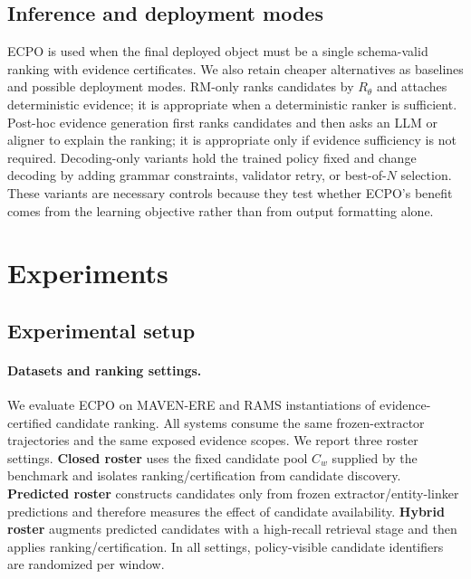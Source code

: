 \documentclass{article}
\begin{document}
\subsection{Inference and deployment modes}
ECPO is used when the final deployed object must be a single schema-valid ranking with evidence certificates. We also retain cheaper alternatives as baselines and possible deployment modes. RM-only ranks candidates by $R_\theta$ and attaches deterministic evidence; it is appropriate when a deterministic ranker is sufficient. Post-hoc evidence generation first ranks candidates and then asks an LLM or aligner to explain the ranking; it is appropriate only if evidence sufficiency is not required. Decoding-only variants hold the trained policy fixed and change decoding by adding grammar constraints, validator retry, or best-of-$N$ selection. These variants are necessary controls because they test whether ECPO's benefit comes from the learning objective rather than from output formatting alone.

\section{Experiments}
\label{sec:experiments}

\subsection{Experimental setup}
\label{sec:exp_setup}

\paragraph{Datasets and ranking settings.}
We evaluate ECPO on MAVEN-ERE and RAMS instantiations of evidence-certified candidate ranking. All systems consume the same frozen-extractor trajectories and the same exposed evidence scopes. We report three roster settings. \textbf{Closed roster} uses the fixed candidate pool $C_w$ supplied by the benchmark and isolates ranking/certification from candidate discovery. \textbf{Predicted roster} constructs candidates only from frozen extractor/entity-linker predictions and therefore measures the effect of candidate availability. \textbf{Hybrid roster} augments predicted candidates with a high-recall retrieval stage and then applies ranking/certification. In all settings, policy-visible candidate identifiers are randomized per window.
\end{document}
